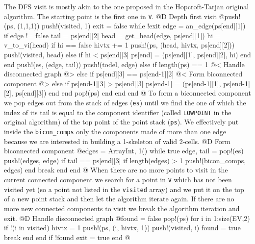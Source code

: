 The DFS visit is mostly akin to the one proposed in the Hopcroft-Tarjan original algorithm.
The starting point is the first one in \texttt{V}.
@D Depth first visit
@{push!(ps, (1,1,1))
push!(visited, 1)
exit = false
while !exit
    edge = an_edge(ps[end][1])
    if edge != false
        tail = ps[end][2]
        head = get_head(edge, ps[end][1])
        hi = v_to_vi(head)
        if hi == false
            hivtx += 1
            push!(ps, (head, hivtx, ps[end][2]))
            push!(visited, head)
        else
            if hi < ps[end][3]
                ps[end] = (ps[end][1], ps[end][2], hi)
            end
        end
        push!(es, (edge, tail))
        push!(todel, edge)
    else
        if length(ps) == 1
            @< Handle disconnected graph @>
        else
            if ps[end][3] == ps[end-1][2]
                @< Form biconnected component @>
            else
                if ps[end-1][3] > ps[end][3]
                    ps[end-1] = (ps[end-1][1], ps[end-1][2], ps[end][3])
                end
            end
            pop!(ps)
        end
    end
end
@}
To form a biconnected component we pop edges out from the stack of edges (\texttt{es}) until we find the one
of which the index of its tail is equal to the component identifier (called \texttt{LOWPOINT} in the original algorithm) 
of the top point of the point stack (\texttt{ps}). We effectively put inside the \texttt{bicon\_comps} only the components
made of more than one edge because we are interested in building a 1-skeleton of valid 2-cells.
@D Form biconnected component
@{edges = Array{Int, 1}()
while true
    edge, tail = pop!(es)
    push!(edges, edge)
    if tail == ps[end][3]
        if length(edges) > 1
            push!(bicon_comps, edges)
        end
        break
    end
end
@}
When there are no more points to visit in the current connected component we search for a point in \texttt{V}
which has not been visited yet (so a point not listed in the \texttt{visited} array) and we put it on the top
of a new point stack and then let the algorithm iterate again. If there are no more new connected components 
to visit we break the algorithm iteration and exit.
@D Handle disconnected graph
@{found = false
pop!(ps)
for i in 1:size(EV,2)
    if !(i in visited)
        hivtx = 1
        push!(ps, (i, hivtx, 1))
        push!(visited, i)
        found = true
        break
    end
end
if !found
    exit = true
end
@}
